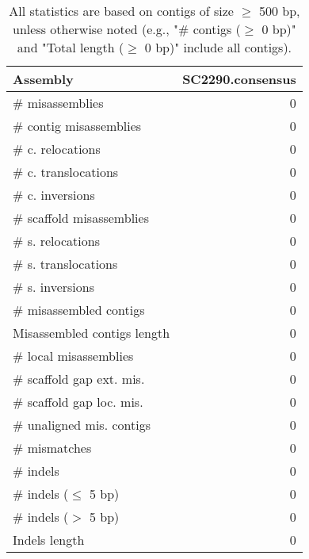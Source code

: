\documentclass[12pt,a4paper]{article}
\begin{document}
\begin{table}[ht]
\begin{center}
\caption{All statistics are based on contigs of size $\geq$ 500 bp, unless otherwise noted (e.g., "\# contigs ($\geq$ 0 bp)" and "Total length ($\geq$ 0 bp)" include all contigs).}
\begin{tabular}{|l*{1}{|r}|}
\hline
Assembly & SC2290.consensus \\ \hline
\# misassemblies & 0 \\ \hline
\hspace{2mm}\# contig misassemblies & 0 \\ \hline
\hspace{5mm}\# c. relocations & 0 \\ \hline
\hspace{5mm}\# c. translocations & 0 \\ \hline
\hspace{5mm}\# c. inversions & 0 \\ \hline
\hspace{2mm}\# scaffold misassemblies & 0 \\ \hline
\hspace{5mm}\# s. relocations & 0 \\ \hline
\hspace{5mm}\# s. translocations & 0 \\ \hline
\hspace{5mm}\# s. inversions & 0 \\ \hline
\# misassembled contigs & 0 \\ \hline
Misassembled contigs length & 0 \\ \hline
\# local misassemblies & 0 \\ \hline
\# scaffold gap ext. mis. & 0 \\ \hline
\# scaffold gap loc. mis. & 0 \\ \hline
\# unaligned mis. contigs & 0 \\ \hline
\# mismatches & 0 \\ \hline
\# indels & 0 \\ \hline
\hspace{5mm}\# indels ($\leq$ 5 bp) & 0 \\ \hline
\hspace{5mm}\# indels ($>$ 5 bp) & 0 \\ \hline
Indels length & 0 \\ \hline
\end{tabular}
\end{center}
\end{table}
\end{document}

